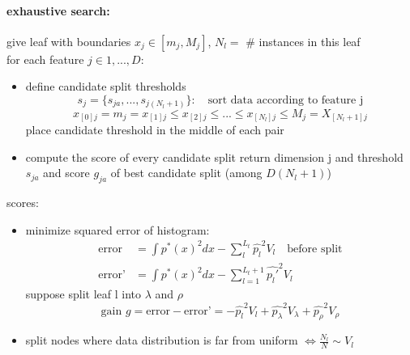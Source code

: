 \documentclass[11pt]{article}
\begin{document}
\begin{itemize}
            \paragraph{exhaustive search:} give leaf with boundaries $x_j \in [m_j, M_j]$, $N_l =$ # instances in this leaf \\
              for each feature $j \in 1,...,D$:
              \begin{itemize}
                \item define candidate split thresholds
                \begin{equation*}
                  s_j = \{ s_{ja},...,s_{j(N_l+1)} \}: \quad \text{sort data according to feature j}
                \end{equation*}
                \begin{equation*}
                  x_{[0]j} = m_j = x_{[1]j} \leq x_{[2]j} \leq ... \leq x_{[N_l]j} \leq M_j = X_{[N_l+1]j}
                \end{equation*}
                place candidate threshold in the middle of each pair
                \item compute the score of every candidate split
                return dimension j and threshold $s_{ja}$ and score $g_{ja}$ of best candidate split (among $D(N_l+1)$)
              \end{itemize}
              scores:
              \begin{itemize}
                \item minimize squared error of histogram:
                \begin{equation*}
                  \begin{align*}
                  \text{error} &= \int p^*(x)^2dx - \sum_l^{L_t} \hat{p_l}^2 V_l \quad \text{before split} \\
                  \text{error'} &= \int p^*(x)^2dx - \sum_{l=1}^{L_t+1} \hat{p_l'}^2 V_l
                  \end{align*}
                \end{equation*}
                suppose split leaf l into $\lambda$ and $\rho$
                \begin{equation*}
                  \text{gain } g = \text{error}-\text{error'} = -\hat{p_l}^2V_l+\hat{p_{\lambda}}^2 V_{\lambda}+\hat{p_{\rho}}^2 V_{\rho}
                \end{equation*}
                \item split nodes where data distribution is far from uniform $\iff \frac{N_l}{N} \sim V_l$

\end{itemize}
\end{itemize}
\end{document}
